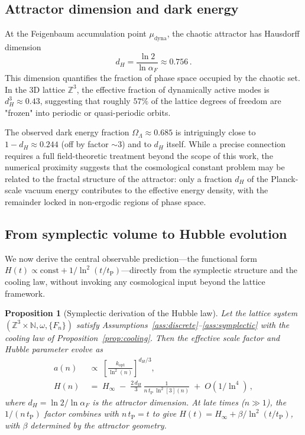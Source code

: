 \documentclass[twocolumn,showpacs,preprintnumbers,amsmath,amssymb,prd]{revtex4-2}
\newtheorem{proposition}{Proposition}
\newcommand{\lnq}{\ln^2}
\newcommand{\tP}{t_{\mathrm{P}}}
\newcommand{\Hinf}{H_{\infty}}
\newcommand{\ZZ}{\mathbb{Z}}
\newcommand{\NN}{\mathbb{N}}
\begin{document}
\subsection{Attractor dimension and dark energy}\label{sec:attractor}

At the Feigenbaum accumulation point $\mu_{\mathrm{dyna}}$, the
chaotic attractor has Hausdorff dimension
\begin{equation}
  d_H = \frac{\ln 2}{\ln \alpha_F} \approx 0.756\,.
  \label{eq:dH}
\end{equation}
This dimension quantifies the fraction of phase space occupied by
the chaotic set.
In the 3D lattice $\ZZ^3$, the effective fraction of dynamically
active modes is $d_H^3 \approx 0.43$, suggesting that roughly
$57\%$ of the lattice degrees of freedom are "frozen" into
periodic or quasi-periodic orbits.

The observed dark energy fraction $\Omega_\Lambda \approx 0.685$
is intriguingly close to $1 - d_H \approx 0.244$ (off by factor
$\sim\!3$) and to $d_H$ itself.
While a precise connection requires a full field-theoretic
treatment beyond the scope of this work, the numerical proximity
suggests that the cosmological constant problem may be related to
the fractal structure of the attractor: only a fraction $d_H$ of
the Planck-scale vacuum energy contributes to the effective
energy density, with the remainder locked in non-ergodic regions
of phase space.

\subsection{From symplectic volume to Hubble evolution}
\label{sec:symplectic_hubble}

We now derive the central observable prediction---the functional
form $H(t) \propto \mathrm{const} + 1/\lnq(t/\tP)$---directly
from the symplectic structure and the cooling law, without
invoking any cosmological input beyond the lattice framework.

\begin{proposition}[Symplectic derivation of the Hubble law]
\label{prop:symplectic_hubble}
Let the lattice system $(\ZZ^3\times\NN, \omega, \{F_n\})$
satisfy Assumptions~\ref{ass:discrete}--\ref{ass:symplectic}
with the cooling law of Proposition~\ref{prop:cooling}. Then
the effective scale factor and Hubble parameter evolve as
\begin{align}
  a(n) &\;\propto\; \left[\frac{k_{\mathrm{opt}}}{\lnq(n)}
    \right]^{d_H/3}, \label{eq:a_symplectic} \\[4pt]
  H(n) &\;=\; \Hinf \;-\; \frac{2\,d_H}{3}\,
    \frac{1}{n\,\tP\,\lnq[3](n)} \;+\; O(1/\ln^4)\,,
    \label{eq:H_symplectic}
\end{align}
where $d_H = \ln 2/\ln\alpha_F$ is the attractor dimension.
At late times ($n \gg 1$), the $1/(n\,\tP)$ factor combines with
$n\,\tP = t$ to give $H(t) = \Hinf + \beta/\lnq(t/\tP)$, with
$\beta$ determined by the attractor geometry.
\end{proposition}
\end{document}
